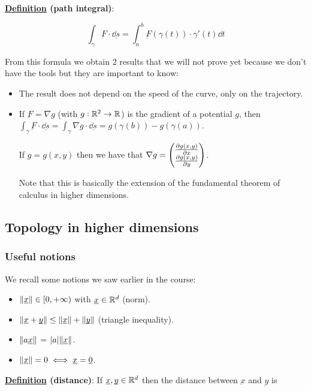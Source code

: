 \documentclass[10pt]{extarticle}
\renewcommand{\vec}[1]{\underbar{\ensuremath{#1}}}
\begin{document}
\textbf{\underline{Definition} (path integral)}:

$$
    \int_\gamma \vec{F} \cdot \dd{\vec{s}} = \int_a^b \vec{F}(\gamma(t)) \cdot \gamma'(t) \dd{t}
$$

From this formula we obtain 2 results that we will not prove yet because we don't have the tools but they are important to know:

\begin{itemize}
    \item The result does not depend on the speed of the curve, only on the trajectory.
    \item If $\vec{F} = \nabla g$ (with $g: \mathbb{R}^2 \to \mathbb{R}$) is the gradient of a potential $g$, then $\int_\gamma \vec{F} \cdot \dd{\vec{s}} = \int_\gamma \nabla g \cdot \dd{\vec{s}} = g(\gamma(b)) - g(\gamma(a))$.

          If $g = g(x, y)$ then we have that $\nabla g = \begin{pmatrix}
                  \pdv{g(x, y)}{x} \\ \pdv{g(x,y)}{y}
              \end{pmatrix}$.

          Note that this is basically the extension of the fundamental theorem of calculus in higher dimensions.
\end{itemize}

\subsection{Topology in higher dimensions}

\subsubsection{Useful notions}

We recall some notions we saw earlier in the course:

\begin{itemize}
    \item $\norm{\vec{x}} \in [0,+\infty)$ with $\vec{x} \in \R^d$ (norm).
    \item $\norm{\vec{x} + \vec{y}} \leq \norm{\vec{x}} + \norm{\vec{y}}$ (triangle inequality).
    \item $\norm{a \vec{x}}$ = $\abs{a} \norm{\vec{x}}$.
    \item $\norm{\vec{x}} = 0 \iff \vec{x} = \vec{0}$.
\end{itemize}

\textbf{\underline{Definition} (distance)}: If $\vec{x}, \vec{y} \in \R^d$ then the distance between $\vec{x}$ and $\vec{y}$ is
\end{document}
